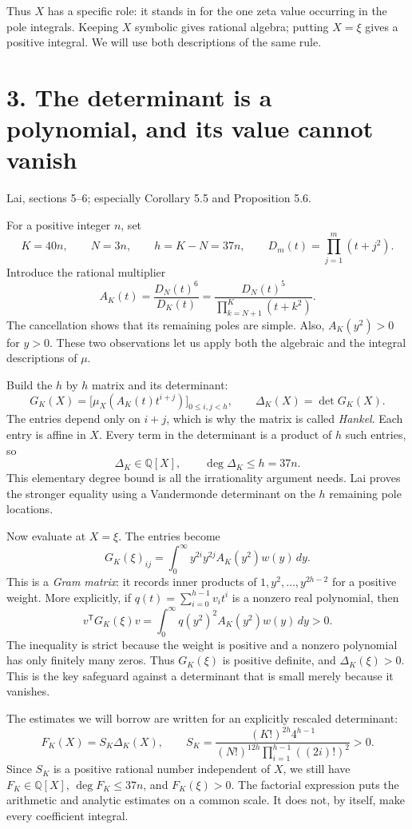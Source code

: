 \documentclass[11pt]{article}
\newcommand{\Q}{\mathbb Q}
\newcommand{\dd}{\,d}
\newcommand{\source}[1]{{\small\color{blue!45!black}#1}\par}
\begin{document}
Thus $X$ has a specific role: it stands in for the one zeta value occurring
in the pole integrals. Keeping $X$ symbolic gives rational algebra;
putting $X=\xi$ gives a positive integral. We will use both descriptions
of the same rule.

\newpage
\section*{3. The determinant is a polynomial, and its value cannot vanish}
\source{Lai, sections 5--6; especially Corollary 5.5 and Proposition 5.6.}
For a positive integer $n$, set
\[
 K=40n,\qquad N=3n,\qquad h=K-N=37n,
 \qquad D_m(t)=\prod_{j=1}^m(t+j^2).
\]
Introduce the rational multiplier
\[
 A_K(t)=\frac{D_N(t)^6}{D_K(t)}
       =\frac{D_N(t)^5}{\displaystyle\prod_{k=N+1}^K(t+k^2)}.
\]
The cancellation shows that its remaining poles are simple. Also,
$A_K(y^2)>0$ for $y>0$. These two observations let us apply both the
algebraic and the integral descriptions of $\mu$.

Build the $h$ by $h$ matrix and its determinant:
\[
 G_K(X)=\bigl[\mu_X(A_K(t)t^{i+j})\bigr]_{0\leq i,j<h},
 \qquad \Delta_K(X)=\det G_K(X).
\]
The entries depend only on $i+j$, which is why the matrix is called
\emph{Hankel}. Each entry is affine in $X$. Every term in the determinant
is a product of $h$ such entries, so
\[
 \Delta_K\in\Q[X],\qquad \deg\Delta_K\leq h=37n.
\]
This elementary degree bound is all the irrationality argument needs.
Lai proves the stronger equality using a Vandermonde determinant on the
$h$ remaining pole locations.

Now evaluate at $X=\xi$. The entries become
\[
 G_K(\xi)_{ij}=\int_0^\infty
        y^{2i}y^{2j}A_K(y^2)w(y)\dd y.
\]
This is a \emph{Gram matrix}: it records inner products of
$1,y^2,\ldots,y^{2h-2}$ for a positive weight. More explicitly, if
$q(t)=\sum_{i=0}^{h-1}v_it^i$ is a nonzero real polynomial, then
\[
 v^{\mathsf T}G_K(\xi)v
 =\int_0^\infty q(y^2)^2A_K(y^2)w(y)\dd y>0.
\]
The inequality is strict because the weight is positive and a nonzero
polynomial has only finitely many zeros. Thus $G_K(\xi)$ is positive
definite, and $\Delta_K(\xi)>0$. This is the key safeguard against a
determinant that is small merely because it vanishes.

The estimates we will borrow are written for an explicitly rescaled
determinant:
\[
 F_K(X)=S_K\Delta_K(X),\qquad
 S_K=\frac{(K!)^{2h}4^{h-1}}
 {(N!)^{12h}\displaystyle\prod_{i=1}^{h-1}((2i)!)^2}>0.
\]
Since $S_K$ is a positive rational number independent of $X$, we still have
$F_K\in\Q[X]$, $\deg F_K\leq37n$, and $F_K(\xi)>0$.
The factorial expression puts the arithmetic and analytic estimates on a
common scale. It does not, by itself, make every coefficient integral.
\end{document}
